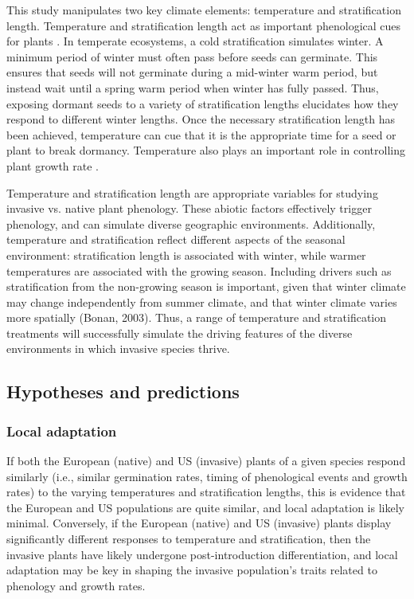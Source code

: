\documentclass[12pt]{article}\usepackage[]{graphicx}\usepackage[]{color}
\begin{document}
	This study manipulates two key climate elements: temperature and stratification length. Temperature and stratification length act as important phenological cues for plants \parencite{Finch2006}. In temperate ecosystems, a cold stratification simulates winter. A minimum period of winter must often pass before seeds can germinate. This ensures that seeds will not germinate during a mid-winter warm period, but instead wait until a spring warm period when winter has fully passed. Thus, exposing dormant seeds to a variety of stratification lengths elucidates how they respond to different winter lengths. Once the necessary stratification length has been achieved, temperature can cue that it is the appropriate time for a seed or plant to break dormancy. Temperature also plays an important role in controlling plant growth rate \parencite{Egli1980,Guilioni2003}.
	
	Temperature and stratification length are appropriate variables for studying invasive vs. native plant phenology. These abiotic factors effectively trigger phenology, and can simulate diverse geographic environments. Additionally, temperature and stratification reflect different aspects of the seasonal environment: stratification length is associated with winter, while warmer temperatures are associated with the growing season. Including drivers such as stratification from the non-growing season is important, given that winter climate may change independently from summer climate, and that winter climate varies more spatially (Bonan, 2003). Thus, a range of temperature and stratification treatments will successfully simulate the driving features of the diverse environments in which invasive species thrive. 
	
	\subsection{Hypotheses and predictions}
	\subsubsection{Local adaptation}
	If both the European (native) and US (invasive) plants of a given species respond similarly (i.e., similar germination rates, timing of phenological events and growth rates) to the varying temperatures and stratification lengths, this is evidence that the European and US populations are quite similar, and local adaptation is likely minimal.  Conversely, if the European (native) and US (invasive) plants display significantly different responses to temperature and stratification, then the invasive plants have likely undergone post-introduction differentiation, and local adaptation may be key in shaping the invasive population’s traits related to phenology and growth rates.
	
\end{document}
